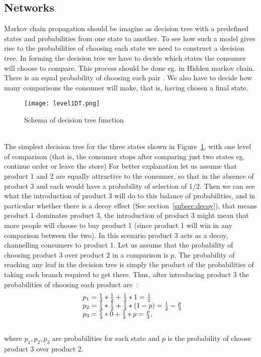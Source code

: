 \subsection{Networks} \label{sec:networks}
Markov chain propagation should be imagine as decision tree with a predefined states and probabilities from one state to another.
To see how such a model gives rise to the probabilities of choosing each state we need to construct a decision tree.
In forming the decision tree we have to decide which states the consumer will choose to compare.
This process should be done eg. in Hidden markov chain. There is an equal probability of choosing each pair .
We also have to decide how many comparisons the consumer will make, that is, having chosen a final state.\\
\begin{figure}[h!]
	\begin{center}
		\texttt{[image: level1DT.png]}
	\end{center}
	\caption{Schema of decision tree function~\cite{patel}}
	\label{DT1}
\end{figure}\\
The simplest decision tree for the three states shown in Figure~\ref{DT1}, with one level of comparison (that is, the consumer stops
after comparing just two states eg. continue order or leave the store) For better explanation let us assume that product 1 and 2 are equally attractive
to the consumer, so that in the absence of product 3 and each would have a probability of selection of 1/2.
Then we can see what the introduction of product 3 will do to this balance of probabilities, and in particular whether there is a decoy effect (See section~\ref{subsec:decoy}),
that means product 1 dominates product 3, the introduction of product 3 might mean that more people will choose to buy product 1
(since product 1 will win in any comparison between the two).
In this scenario product 3 acts as a decoy, channelling consumers to product 1. Let us assume that the probability of choosing product 3 over product 2 in a comparison is $p$.
The probability of reaching any leaf in the decision tree is simply the product of the probabilities of taking each branch required to get there.
Thus, after introducing product 3 the probabilities of choosing each product are~\cite{patel}:\\
\begin{equation} \label{eq:12}
\begin{array}{l@{}l}
	p_1 = \frac{1}{3}*\frac{1}{2}+\frac{1}{3}*1 = \frac{1}{2} \\
	p_2 = \frac{1}{3}*\frac{1}{2}+\frac{1}{3}*(1-p) = \frac{1}{2} - \frac{p}{3} \\
	p_3 = \frac{1}{3}*0+\frac{1}{3}*p = \frac{p}{3},
\end{array}
\end{equation}\\
where $p_1,p_2,p_3$ are probabilities for each state and $p$ is the probability of choose product 3 over product 2.\\
\\
